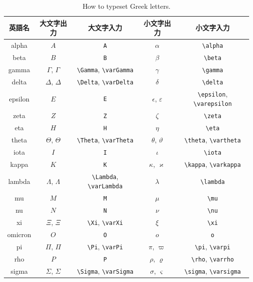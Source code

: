 \documentclass[
    paper=a4paper,      %
    article,            %
    fontsize=11pt,      %
    jafontsize=11pt,    %
    head_space=25mm,    %
    foot_space=25mm,    %
    gutter=20mm,        %
    fore-edge=20mm      %
    ]{jlreq}            %
\begin{document}
\begin{table}[t]
    \centering
    \caption{How to typeset Greek letters.}
    \label{tb:greek}
    \begin{tabular}{c|c|c|c|c} \hline\hline
        英語名 & 大文字出力 & 大文字入力 & 小文字出力 & 小文字入力 \\ \hline
        alpha & $A$ & \verb|A| & $\alpha$ & \verb|\alpha| \\ \hline
        beta & $B$ & \verb|B| & $\beta$ & \verb|\beta| \\ \hline
        gamma & $\Gamma$, $\varGamma$ & \verb|\Gamma|, \verb|\varGamma| & $\gamma$ & \verb|\gamma| \\ \hline
        delta & $\Delta$, $\varDelta$ & \verb|\Delta|, \verb|\varDelta| & $\delta$ & \verb|\delta| \\ \hline
        epsilon & $E$ & \verb|E| & $\epsilon$, $\varepsilon$ & \verb|\epsilon|, \verb|\varepsilon| \\ \hline
        zeta & $Z$ & \verb|Z| & $\zeta$ & \verb|\zeta| \\ \hline
        eta & $H$ & \verb|H| & $\eta$ & \verb|\eta| \\ \hline
        theta & $\Theta$, $\varTheta$ & \verb|\Theta|, \verb|\varTheta| & $\theta$, $\vartheta$ & \verb|\theta|, \verb|\vartheta| \\ \hline
        iota & $I$ & \verb|I| & $\iota$ & \verb|\iota| \\ \hline
        kappa & $K$ & \verb|K| & $\kappa$, $\varkappa$ & \verb|\kappa|, \verb|\varkappa| \\ \hline
        lambda & $\Lambda$, $\varLambda$ & \verb|\Lambda|, \verb|\varLambda| & $\lambda$ & \verb|\lambda| \\ \hline
        mu & $M$ & \verb|M| & $\mu$ & \verb|\mu| \\ \hline
        nu & $N$ & \verb|N| & $\nu$ & \verb|\nu| \\ \hline
        xi & $\Xi$, $\varXi$ & \verb|\Xi|, \verb|\varXi| & $\xi$ & \verb|\xi| \\ \hline
        omicron & $O$ & \verb|O| & $o$ & \verb|o| \\ \hline
        pi & $\Pi$, $\varPi$ & \verb|\Pi|, \verb|\varPi| & $\pi$, $\varpi$ & \verb|\pi|, \verb|\varpi| \\ \hline
        rho & $P$ & \verb|P| & $\rho$, $\varrho$ & \verb|\rho|, \verb|\varrho| \\ \hline
        sigma & $\Sigma$, $\varSigma$ & \verb|\Sigma|, \verb|\varSigma| & $\sigma$, $\varsigma$ & \verb|\sigma|, \verb|\varsigma| \\ \hline

\end{tabular}
\end{table}
\end{document}
